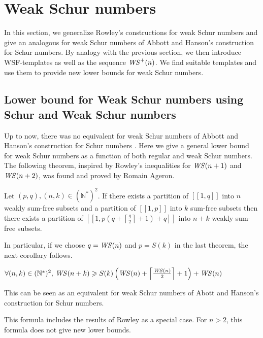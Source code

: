 \section{Weak Schur numbers}
\label{WeakSchur}

\qquad In this section, we generalize Rowley's constructions for weak Schur numbers \cite{RowleyWS} and give an analogous
for weak Schur numbers of Abbott and Hanson's construction for Schur numbers. By analogy with the previous section,
we then introduce WSF-templates as well as the sequence \(\mathit{WS}^+(n)\). We find suitable templates and use them to
provide new lower bounds for weak Schur numbers.

\subsection{Lower bound for Weak Schur numbers using Schur and Weak Schur numbers}

\qquad Up to now, there was no equivalent for weak Schur numbers of Abbott and Hanson's construction for Schur numbers
\cite{AbbottHanson}. Here we give a general lower bound for weak Schur numbers as a function of both regular and
weak Schur numbers. The following theorem, inspired by Rowley's inequalities for \(\mathit{WS} (n+1)\) and \(\mathit{WS} (n+2)\),
was found and proved by Romain Ageron.

\begin{theorem}
Let \((p,q), (n,k) \in (\mathbb{N}^*)^2\). If there exists a partition of \([\![1,q]\!]\) into \(n\) weakly sum-free
subsets and a partition of \([\![1,p]\!]\) into \(k\) sum-free
subsets then there exists a partition of \([\![1,p(q+\left \lceil \frac{q}{2} \right \rceil + 1)+q]\!]\) into \(n+k\)
weakly sum-free subsets.
\end{theorem}

In particular, if we choose \(q = \mathit{WS} (n)\) and \(p = S(k)\) in the last theorem, the next corollary follows.

\begin{corollary}
\( \forall (n,k) \in (\mathbb{N}^*)^2 \text{, } \mathit{WS} (n+k) \geqslant S(k) \left (\mathit{WS} (n) + \left \lceil \frac{\mathit{WS} (n)}{2}
\right \rceil +1 \right) + \mathit{WS} (n)\)
\end{corollary}

\begin{remark}
This can be seen as an equivalent for weak Schur numbers of Abott and Hanson's construction for Schur numbers.
\end{remark}

\begin{remark}
This formula includes the results of Rowley \cite{RowleyWS} as a special case. For \(n>2\), this formula does not give
new lower bounds.
\end{remark}

